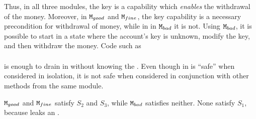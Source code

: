 \begin{example}
Thus, in all three modules, the key is a capability which \emph{enables} the withdrawal of the money. 
Moreover, in $\mbox{\normalfont{\texttt{M}}}_{{good}}$ and $\mbox{\normalfont{\texttt{M}}}_{{fine}}$, the key capability
is a necessary precondition for withdrawal of money, while in %
 in $\mbox{\normalfont{\texttt{M}}}_{{bad}}$ it is not. %
Using $\mbox{\normalfont{\texttt{M}}}_{{bad}}$, it is possible to start in a state where the account's key is unknown, modify the key, and then withdraw the money. 
Code   such as 
\\ 
$\ \strut \hspace{.2in} $  
\\ 
is enough to drain   in \ModB without knowing the \password.
Even though   in  \ModB is ``safe'' when considered in isolation, it is not safe when considered in conjunction with other methods from the same module. 

$\mbox{\normalfont{\texttt{M}}}_{{good}}$ and $\mbox{\normalfont{\texttt{M}}}_{{fine}}$ satisfy $S_2$ and $S_3$, while $\mbox{\normalfont{\texttt{M}}}_{{bad}}$ satisfies neither. None satisfy $S_1$, because   leaks an .

\end{example}
 


